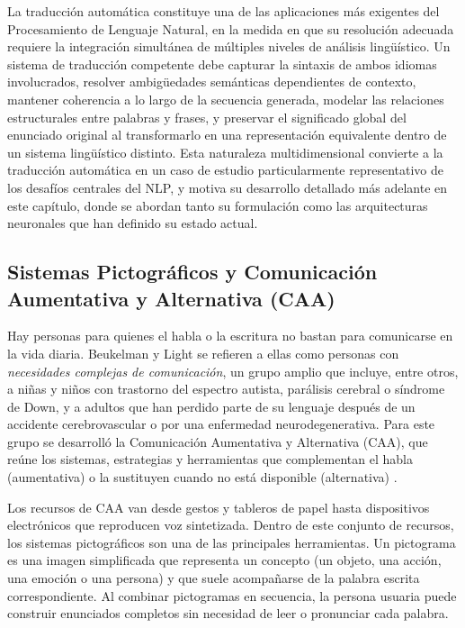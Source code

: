 La traducción automática constituye una de las aplicaciones más exigentes del Procesamiento de Lenguaje Natural, en la medida en que su resolución adecuada requiere la integración simultánea de múltiples niveles de análisis lingüístico. Un sistema de traducción competente debe capturar la sintaxis de ambos idiomas involucrados, resolver ambigüedades semánticas dependientes de contexto, mantener coherencia a lo largo de la secuencia generada, modelar las relaciones estructurales entre palabras y frases, y preservar el significado global del enunciado original al transformarlo en una representación equivalente dentro de un sistema lingüístico distinto. Esta naturaleza multidimensional convierte a la traducción automática en un caso de estudio particularmente representativo de los desafíos centrales del NLP, y motiva su desarrollo detallado más adelante en este capítulo, donde se abordan tanto su formulación como las arquitecturas neuronales que han definido su estado actual.


\vspace{0.5cm}
\subsection{Sistemas Pictográficos y Comunicación Aumentativa y Alternativa (CAA)}
\vspace{0.2cm}

Hay personas para quienes el habla o la escritura no bastan para comunicarse en la vida diaria. Beukelman y Light \cite{beukelman2020aac} se refieren a ellas como personas con \textit{necesidades complejas de comunicación}, un grupo amplio que incluye, entre otros, a niñas y niños con trastorno del espectro autista, parálisis cerebral o síndrome de Down, y a adultos que han perdido parte de su lenguaje después de un accidente cerebrovascular o por una enfermedad neurodegenerativa. Para este grupo se desarrolló la Comunicación Aumentativa y Alternativa (CAA), que reúne los sistemas, estrategias y herramientas que complementan el habla (aumentativa) o la sustituyen cuando no está disponible (alternativa) \cite{beukelman2020aac}.

Los recursos de CAA van desde gestos y tableros de papel hasta dispositivos electrónicos que reproducen voz sintetizada. Dentro de este conjunto de recursos, los sistemas pictográficos son una de las principales herramientas. Un pictograma es una imagen simplificada que representa un concepto (un objeto, una acción, una emoción o una persona) y que suele acompañarse de la palabra escrita correspondiente. Al combinar pictogramas en secuencia, la persona usuaria puede construir enunciados completos sin necesidad de leer o pronunciar cada palabra.

